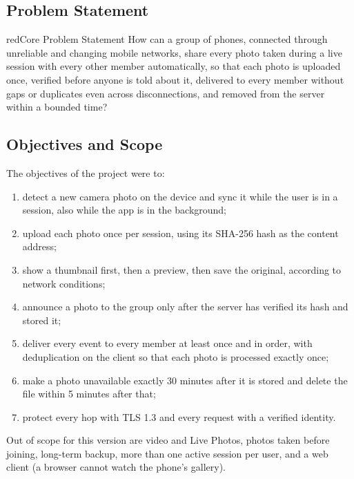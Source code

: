 \subsection{Problem Statement}

\begin{pbox}{red}{Core Problem Statement}
How can a group of phones, connected through unreliable and changing mobile networks, share every photo taken during a live session with every other member automatically, so that each photo is uploaded once, verified before anyone is told about it, delivered to every member without gaps or duplicates even across disconnections, and removed from the server within a bounded time?
\end{pbox}

\subsection{Objectives and Scope}

The objectives of the project were to:

\begin{enumerate}
  \item detect a new camera photo on the device and sync it while the user is in a session, also while the app is in the background;
  \item upload each photo once per session, using its SHA-256 hash as the content address;
  \item show a thumbnail first, then a preview, then save the original, according to network conditions;
  \item announce a photo to the group only after the server has verified its hash and stored it;
  \item deliver every event to every member at least once and in order, with deduplication on the client so that each photo is processed exactly once;
  \item make a photo unavailable exactly 30 minutes after it is stored and delete the file within 5 minutes after that;
  \item protect every hop with TLS 1.3 and every request with a verified identity.
\end{enumerate}

Out of scope for this version are video and Live Photos, photos taken before joining, long-term backup, more than one active session per user, and a web client (a browser cannot watch the phone's gallery).
